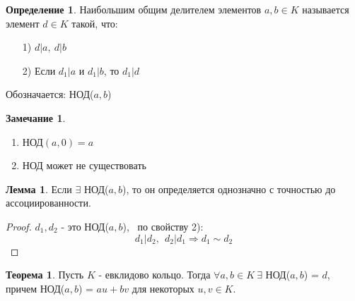 \documentclass[a4paper, 12pt]{article}
\newcommand\tab[1][.5cm]{\hspace*{#1}}
\theoremstyle{definition}
\newtheorem*{definition}{Определение}
\newtheorem*{theorem}{Теорема}
\newtheorem*{lemma}{Лемма}
\newtheorem*{remark}{Замечание}
\begin{document}
  \begin{definition}
    Наибольшим общим делителем элементов $a,b \in K$ называется элемент $d \in K$ такой, что: 
    \begin{enumerate}
      \item[1)] $d|a, \ d|b$
      \item[2)] Если $d_1|a$ и $d_1|b$, то $d_1|d$     
    \end{enumerate}
    Обозначается: НОД($a,b$) 
  \end{definition}
  \begin{remark}\tab
    \begin{enumerate}
      \item НОД$(a,0) = a$
      \item НОД может не существовать
    \end{enumerate}
  \end{remark}
  \begin{lemma}
    Если $\exists$ НОД($a,b$), то он определяется однозначно с точностью до ассоциированности.
  \end{lemma}
  \begin{proof}
    $d_1, d_2$ - это НОД($a,b$), \ по свойству 2): 
    $$d_1|d_2, \ \ d_2|d_1 \Longrightarrow d_1 \sim d_2$$   
  \end{proof}
  \begin{theorem}
    Пусть $K$ - евклидово кольцо. Тогда $\forall a, b \in K \ \exists$ НОД($a,b$) = $d$, причем НОД($a,b$) = $au + bv$ для некоторых $u, v \in K$.     
  \end{theorem}
\end{document}
